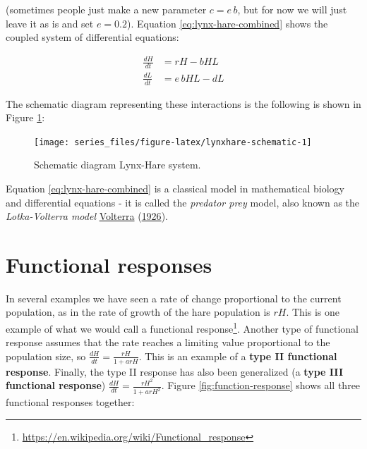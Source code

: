 \documentclass[
]{krantz}
\renewcommand{\href}[2]{#2\footnote{\url{#1}}}
\theoremstyle{definition}
\theoremstyle{definition}
\theoremstyle{definition}
\theoremstyle{definition}
\theoremstyle{remark}
\begin{document}
(sometimes people just make a new parameter \(c=e \, b\), but for now we will just leave it as is and set \(e=0.2\)). Equation \eqref{eq:lynx-hare-combined} shows the coupled system of differential equations:

\begin{equation}
\begin{split}
\frac{dH}{dt} &= r H - b HL \\
\frac{dL}{dt} &=e\,bHL -dL
\end{split}
\label{eq:lynx-hare-combined}
\end{equation}

The schematic diagram representing these interactions is the following is shown in Figure \ref{fig:lynxhare-schematic}:

\begin{figure}

{\centering \texttt{[image: series\_files/figure-latex/lynxhare-schematic-1]} 

}

\caption{Schematic diagram Lynx-Hare system.}\label{fig:lynxhare-schematic}
\end{figure}

Equation \eqref{eq:lynx-hare-combined} is a classical model in mathematical biology and differential equations - it is called the \emph{predator prey} model, also known as the \emph{Lotka-Volterra model} \protect\hyperlink{ref-volterra_fluctuations_1926}{Volterra} (\protect\hyperlink{ref-volterra_fluctuations_1926}{1926}).

\hypertarget{functional-responses}{%
\section{Functional responses}\label{functional-responses}}

In several examples we have seen a rate of change proportional to the current population, as in the rate of growth of the hare population is \(rH\). This is one example of what we would call a \href{https://en.wikipedia.org/wiki/Functional_response}{functional response}. Another type of functional response assumes that the rate reaches a limiting value proportional to the population size, so \(\displaystyle \frac{dH}{dt} = \frac{rH}{1+arH}\). This is an example of a \textbf{type II functional response}. Finally, the type II response has also been generalized (a \textbf{type III functional response}) \(\displaystyle \frac{dH}{dt} = \frac{rH^{2}}{1+arH^{2}}\). Figure \ref{fig:function-response} shows all three functional responses together:
\end{document}
